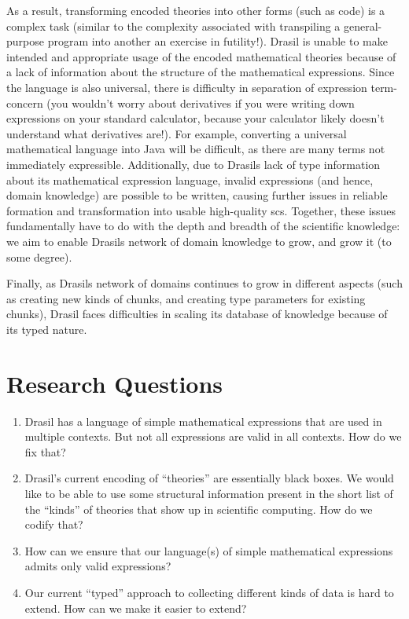As a result, transforming encoded theories into other forms (such as code) is a
complex task (similar to the complexity associated with transpiling a
general-purpose program into another \textemdash{} an exercise in futility!). Drasil is
unable to make intended and appropriate usage of the encoded mathematical
theories because of a lack of information about the structure of the
mathematical expressions. Since the language is also universal, there is
difficulty in separation of expression term-concern (you wouldn't worry about
derivatives if you were writing down expressions on your standard calculator,
because your calculator likely doesn't understand what derivatives are!). For
example, converting a universal mathematical language into Java will be
difficult, as there are many terms not immediately expressible. Additionally,
due to Drasils lack of type information about its mathematical expression
language, invalid expressions (and hence, domain knowledge) are possible to be
written, causing further issues in reliable formation and transformation into
usable high-quality \acs{scs}. Together, these issues fundamentally have to do
with the depth and breadth of the scientific knowledge: we aim to enable Drasils
network of domain knowledge to grow, and grow it (to some degree).

Finally, as Drasils network of domains continues to grow in different aspects
(such as creating new kinds of chunks, and creating type parameters for existing
chunks), Drasil faces difficulties in scaling its database of knowledge because
of its typed nature.

\section{Research Questions}
\label{sec:intro:researchquestions}

\begin{enumerate}

      \item[\namedlabel{rq:lang_division}{RQ1}] Drasil has a language of simple
            mathematical expressions that are used in multiple contexts. But not
            all expressions are valid in all contexts. How do we fix that?

      \item[\namedlabel{rq:modelkinds}{RQ2}] Drasil's current encoding of
            ``theories'' are essentially black boxes. We would like to be able
            to use some structural information present in the short list of the
            ``kinds'' of theories that show up in scientific computing. How do
            we codify that?

      \item[\namedlabel{rq:typing}{RQ3}] How can we ensure that our language(s)
            of simple mathematical expressions admits only valid expressions?

      \item[\namedlabel{rq:chunkdb}{RQ4}] Our current ``typed'' approach to
            collecting different kinds of data is hard to extend. How can we
            make it easier to extend?

\end{enumerate}

